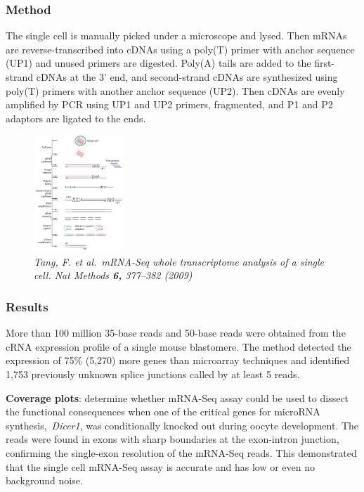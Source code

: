 \hypertarget{method}{%
\subsubsection{Method}\label{method}}

The single cell is manually picked under a microscope and lysed. Then
mRNAs are reverse-transcribed into cDNAs using a poly(T) primer with
anchor sequence (UP1) and unused primers are digested. Poly(A) tails are
added to the first-strand cDNAs at the 3' end, and second-strand cDNAs
are synthesized using poly(T) primers with another anchor sequence
(UP2). Then cDNAs are evenly amplified by PCR using UP1 and UP2 primers,
fragmented, and P1 and P2 adaptors are ligated to the ends.

\begin{figure}
\centering
\includegraphics[width=0.3\textwidth]{images/Screen_Shot_2023-02-20_at_19-18-51.png}
\caption{\emph{Tang, F. et al.~mRNA-Seq whole transcriptome analysis of
a single cell. Nat Methods \textbf{6,} 377--382 (2009)}}
\end{figure}

\hypertarget{results}{%
\subsubsection{\texorpdfstring{\textbf{Results}}{Results}}\label{results}}

More than 100 million 35-base reads and 50-base reads were obtained from
the cRNA expression profile of a single mouse blastomere. The method
detected the expression of 75\% (5,270) more genes than microarray
techniques and identified 1,753 previously unknown splice junctions
called by at least 5 reads.

\textbf{Coverage plots}: determine whether mRNA-Seq assay could be used
to dissect the functional consequences when one of the critical genes
for microRNA synthesis,~\emph{Dicer1}, was conditionally knocked out
during oocyte development. The reads were found in exons with sharp
boundaries at the exon-intron junction, confirming the single-exon
resolution of the mRNA-Seq reads. This demonstrated that the single cell
mRNA-Seq assay is accurate and has low or even no background noise.

